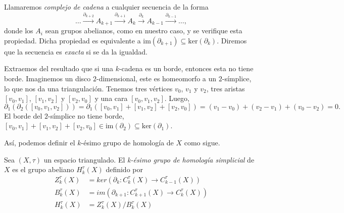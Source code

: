 \begin{remark}
    Llamaremos \textit{complejo de cadena} a cualquier secuencia de la forma
        \begin{equation*}
            \dots \overset{\partial_{k+2}}{\longrightarrow} A_{k+1} \overset{\partial_{k+1}}{\longrightarrow} A_{k} \overset{\partial_{k}}{\longrightarrow} A_{k-1} \overset{\partial_{k-1}}{\longrightarrow} \dots,
        \end{equation*}
        donde los $A_i$ sean grupos abelianos, como en nuestro caso, y se verifique esta propiedad. Dicha propiedad es equivalente a $\text{im}(\partial_{k+1})\subseteq\text{ker}(\partial_k)$. Diremos que la secuencia es \textit{exacta} si se da la igualdad.
\end{remark}

\bigskip

Extraemos del resultado que si una $k$-cadena es un borde, entonces esta no tiene borde. Imaginemos un disco $2$-dimensional, este es homeomorfo a un $2$-símplice, lo que nos da una triangulación. Tenemos tres vértices $v_0$, $v_1$ y $v_2$, tres aristas $[v_0,v_1]$, $[v_1,v_2]$ y $[v_2,v_0]$ y una cara $[v_0, v_1, v_2]$. Luego,
\begin{equation*}
    \partial_1(\partial_2([v_0, v_1, v_2])) = \partial_1([v_0,v_1]+[v_1,v_2]+[v_2,v_0]) = (v_1-v_0) + (v_2-v_1) + (v_0-v_2) = 0. 
\end{equation*}
El borde del $2$-símplice no tiene borde, $[v_0,v_1]+[v_1,v_2]+[v_2,v_0]\in \text{im}(\partial_2) \subseteq \text{ker}(\partial_1)$.

Así, podemos definir el $k$-ésimo grupo de homología de $X$ como sigue.

\begin{definition}
    Sea $(X,\tau)$ un espacio triangulado. El \textit{k-ésimo grupo de homología simplicial} de $X$ es el grupo abeliano $H^{\tau}_k(X)$ definido por
    \begin{align*}
        Z^{\tau}_k(X) &= ker(\partial_k: C^{\tau}_k(X) \to C^{\tau}_{k-1}(X)) \\
        B^{\tau}_k(X) &= im(\partial_{k+1}: C^{\tau}_{k+1}(X) \to C^{\tau}_{k}(X)) \\
        H^{\tau}_k(X) &= Z^{\tau}_k(X)/B^{\tau}_k(X)
    \end{align*}
\end{definition}

